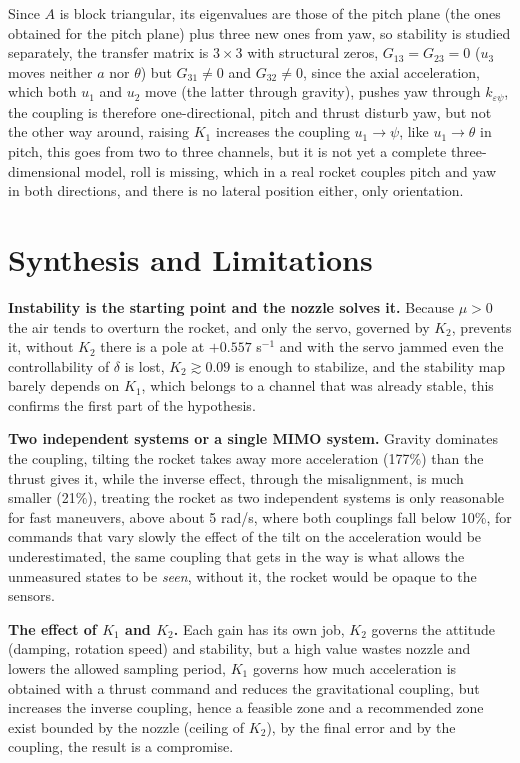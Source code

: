 \documentclass[article, 11pt]{IEEEtran}   %
\begin{document}
Since $A$ is block triangular, its eigenvalues are those of the pitch plane (the ones obtained for the pitch plane) plus three new ones from yaw, so stability is studied separately, the transfer matrix is $3\times3$ with structural zeros, $G_{13}=G_{23}=0$ ($u_3$ moves neither $a$ nor $\theta$) but $G_{31}\ne0$ and $G_{32}\ne0$, since the axial acceleration, which both $u_1$ and $u_2$ move (the latter through gravity), pushes yaw through $k_{\varepsilon\psi}$, the coupling is therefore one-directional, pitch and thrust disturb yaw, but not the other way around, raising $K_1$ increases the coupling $u_1\to\psi$, like $u_1\to\theta$ in pitch, this goes from two to three channels, but it is not yet a complete three-dimensional model, roll is missing, which in a real rocket couples pitch and yaw in both directions, and there is no lateral position either, only orientation.


\section{Synthesis and Limitations}
\textbf{Instability is the starting point and the nozzle solves it.} Because $\mu>0$ the air tends to overturn the rocket, and only the servo, governed by $K_2$, prevents it, without $K_2$ there is a pole at $+0.557$ s$^{-1}$ and with the servo jammed even the controllability of $\delta$ is lost, $K_2\gtrsim0.09$ is enough to stabilize, and the stability map barely depends on $K_1$, which belongs to a channel that was already stable, this confirms the first part of the hypothesis.

\textbf{Two independent systems or a single MIMO system.} Gravity dominates the coupling, tilting the rocket takes away more acceleration (177\%) than the thrust gives it, while the inverse effect, through the misalignment, is much smaller (21\%), treating the rocket as two independent systems is only reasonable for fast maneuvers, above about 5 rad/s, where both couplings fall below 10\%, for commands that vary slowly the effect of the tilt on the acceleration would be underestimated, the same coupling that gets in the way is what allows the unmeasured states to be \emph{seen}, without it, the rocket would be opaque to the sensors.

\textbf{The effect of $K_1$ and $K_2$.} Each gain has its own job, $K_2$ governs the attitude (damping, rotation speed) and stability, but a high value wastes nozzle and lowers the allowed sampling period, $K_1$ governs how much acceleration is obtained with a thrust command and reduces the gravitational coupling, but increases the inverse coupling, hence a feasible zone and a recommended zone exist bounded by the nozzle (ceiling of $K_2$), by the final error and by the coupling, the result is a compromise.
\end{document}
